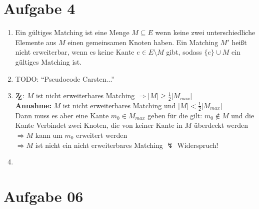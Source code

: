 \documentclass[10pt,a4paper]{article}
\newcommand{\zz}{\mathrm{Z\kern-.3em\raise-0.5ex\hbox{Z}}}
\begin{document}
\section*{Aufgabe 4}

    \begin{enumerate}[label={\alph*)}]
        \item Ein gültiges Matching ist eine Menge $M \subseteq E$ wenn keine
            zwei unterschiedliche Elemente aus $M$ einen gemeinsamen Knoten
            haben.
            Ein Matching $M'$ heißt nicht erweiterbar, wenn es keine Kante
            $ e \in E \setminus M$ gibt, sodass $\{e\} \cup M$ ein gültiges
            Matching ist.
        \item
            TODO: ``Pseudocode Carsten...''
        \item
            $\zz$: $M$ ist nicht erweiterbares Matching $\Rightarrow
            |M| \geq \frac{1}{2}|M_{max}|$
            \\
            \textbf{Annahme:} $M$ ist nicht erweiterbares Matching und
            $|M| < \frac{1}{2}|M_{max}|$
            \\
            Dann muss es aber eine Kante $m_0 \in M_{max}$ geben für
            die gilt: $m_0 \notin M$ und die Kante Verbindet zwei Knoten,
            die von keiner Kante in $M$ überdeckt werden
            \\
            $\Rightarrow M$ kann um $m_0$ erweitert werden
            \\
            $\Rightarrow M$ ist nicht ein nicht erweiterbares Matching
            $\lightning$ Widerspruch!
        \item

    \end{enumerate}

\section*{Aufgabe 06}
\end{document}
